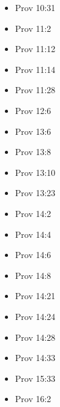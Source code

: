 \documentclass[14pt]{article}
\begin{document}
\begin{multicols}{2}
\begin{itemize}
									\item Prov 10:31
									
									\item Prov 11:2
									
									\item Prov 11:12
									
									\item Prov 11:14
									
									\item Prov 11:28
									
									\item Prov 12:6
									
									\item Prov 13:6
									
									\item Prov 13:8
									
									\item Prov 13:10
									
									\item Prov 13:23
									
									\item Prov 14:2
									
									\item Prov 14:4
									
									\item Prov 14:6
									
									\item Prov 14:8
									
									\item Prov 14:21
									
									\item Prov 14:24
									
									\item Prov 14:28
									
									\item Prov 14:33
									
									\item Prov 15:33
									
									\item Prov 16:2
									

\end{itemize}
\end{multicols}
\end{document}
